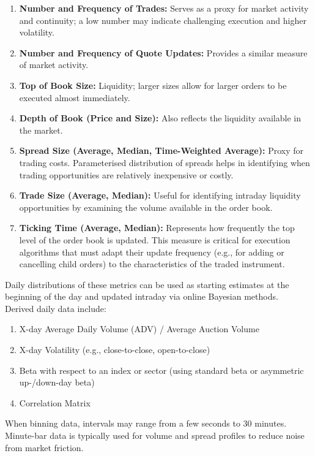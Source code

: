 \begin{definition} 
\begin{enumerate}[label=\roman*.]
\setlength{\itemsep}{0pt}
\item \textbf{Number and Frequency of Trades:} Serves as a proxy for market activity and continuity; a low number may indicate challenging execution and higher volatility.
\item \textbf{Number and Frequency of Quote Updates:} Provides a similar measure of market activity.
\item \textbf{Top of Book Size:} Liquidity; larger sizes allow for larger orders to be executed almost immediately.
\item \textbf{Depth of Book (Price and Size):} Also reflects the liquidity available in the market.
\item \textbf{Spread Size (Average, Median, Time-Weighted Average):} Proxy for trading costs. Parameterised distribution of spreads helps in identifying when trading opportunities are relatively inexpensive or costly.
\item \textbf{Trade Size (Average, Median):} Useful for identifying intraday liquidity opportunities by examining the volume available in the order book.
\item \textbf{Ticking Time (Average, Median):} Represents how frequently the top level of the order book is updated. This measure is critical for execution algorithms that must adapt their update frequency (e.g., for adding or cancelling child orders) to the characteristics of the traded instrument.
\end{enumerate}
Daily distributions of these metrics can be used as starting estimates at the beginning of the day and updated intraday via online Bayesian methods.\\
Derived daily data include:
\begin{enumerate}[label=\roman*.]
\setlength{\itemsep}{0pt}
\item X-day Average Daily Volume (ADV) / Average Auction Volume
\item X-day Volatility (e.g., close-to-close, open-to-close)
\item Beta with respect to an index or sector (using standard beta or asymmetric up-/down-day beta)
\item Correlation Matrix
\end{enumerate}
When binning data, intervals may range from a few seconds to 30 minutes. Minute-bar data is typically used for volume and spread profiles to reduce noise from market friction.
\end{definition}

